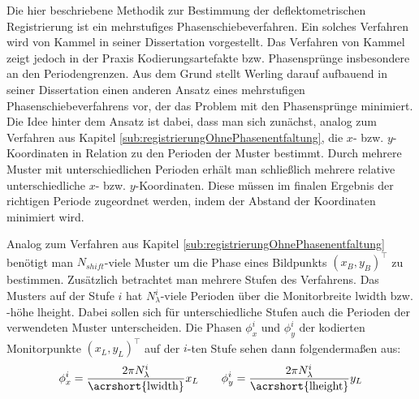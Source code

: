 Die hier beschriebene Methodik zur Bestimmung der deflektometrischen Registrierung ist ein mehrstufiges Phasenschiebeverfahren.
Ein solches Verfahren wird von Kammel in seiner Dissertation \cite{kit_kammel} vorgestellt.
Das Verfahren von Kammel zeigt jedoch in der Praxis Kodierungsartefakte bzw. Phasensprünge insbesondere an den Periodengrenzen.
Aus dem Grund stellt Werling darauf aufbauend in seiner Dissertation \cite{kit_werling} einen anderen Ansatz eines mehrstufigen Phasenschiebeverfahrens vor, der das Problem mit den Phasensprünge minimiert.
Die Idee hinter dem Ansatz ist dabei, dass man sich zunächst, analog zum Verfahren aus Kapitel \ref{sub:registrierungOhnePhasenentfaltung}, die $x$- bzw. $y$-Koordinaten in Relation zu den Perioden der Muster bestimmt.
Durch mehrere Muster mit unterschiedlichen Perioden erhält man schließlich mehrere relative unterschiedliche $x$- bzw. $y$-Koordinaten.
Diese müssen im finalen Ergebnis der richtigen Periode zugeordnet werden, indem der Abstand der Koordinaten minimiert wird.

\p
Analog zum Verfahren aus Kapitel \ref{sub:registrierungOhnePhasenentfaltung} benötigt man $N_{shift}$-viele Muster um die Phase eines Bildpunkts $(x_B, y_B)^\top$ zu bestimmen.
Zusätzlich betrachtet man mehrere Stufen des Verfahrens.
Das Musters auf der Stufe $i$ hat $N_\lambda^i$-viele Perioden über die Monitorbreite \acrshort{lwidth} bzw. -höhe \acrshort{lheight}.
Dabei sollen sich für unterschiedliche Stufen auch die Perioden der verwendeten Muster unterscheiden.
Die Phasen $\phi_x^i$ und $\phi_y^i$ der kodierten Monitorpunkte $(x_L, y_L)^\top$ auf der $i$-ten Stufe sehen dann folgendermaßen aus:
%
\begin{equation}
	\phi_x^i = \dfrac{2\pi N_\lambda^i}{\text{\acrshort{lwidth}}} x_L
	\qquad
	\phi_y^i = \dfrac{2\pi N_\lambda^i}{\text{\acrshort{lheight}}} y_L
\end{equation}

